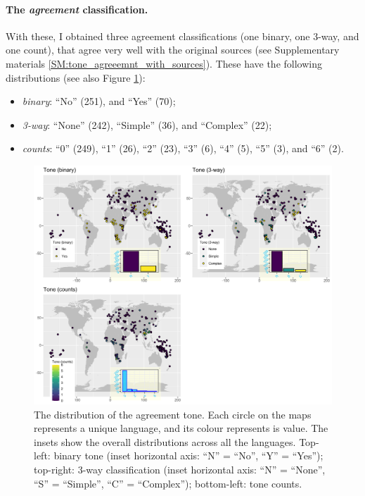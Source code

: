 \documentclass[twoside,twocolumn]{article}
\begin{document}
\paragraph{The \emph{agreement} classification.}
With these, I obtained three agreement classifications (one binary, one 3-way, and one count), that agree very well with the original sources (see Supplementary materials \ref{SM:tone_agreeemnt_with_sources}).
These have the following distributions (see also Figure \ref{Fig:map_tone}):

\begin{itemize}
  \item \emph{binary}: ``No'' (251), and ``Yes'' (70);
  \item \emph{3-way}: ``None'' (242), ``Simple'' (36), and ``Complex'' (22);
  \item \emph{counts}: ``0'' (249), ``1'' (26), ``2'' (23), ``3'' (6), ``4'' (5), ``5'' (3), and ``6'' (2).
\end{itemize}

\begin{figure}[h]
  \centering
  \includegraphics[width=\textwidth]{../../code/figures/map_tone}
  \caption{The distribution of the agreement tone. Each circle on the maps represents a unique language, and its colour represents is value. The insets show the overall distributions across all the languages. Top-left: binary tone (inset horizontal axis: ``N'' = ``No'', ``Y'' = ``Yes''); top-right: 3-way classification (inset horizontal axis: ``N'' = ``None'', ``S'' = ``Simple'', ``C'' = ``Complex''); bottom-left: tone counts.}
  \label{Fig:map_tone}
\end{figure}
\end{document}
